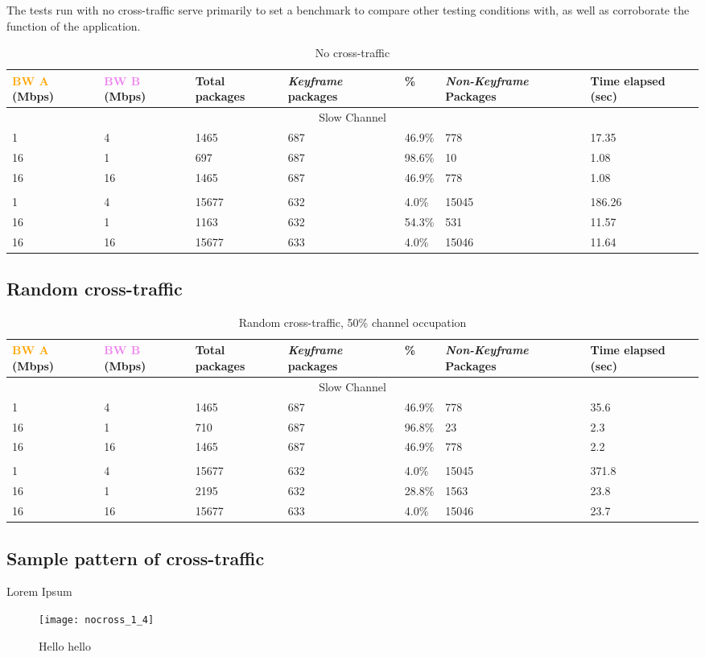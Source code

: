 The tests run with no cross-traffic serve primarily to set a benchmark to compare other testing conditions with, as well as corroborate the function of the application. 

\begin{table}[htbp]
\caption{No cross-traffic}
\break
\setlength{\arrayrulewidth}{1mm}
\setlength{\tabcolsep}{12pt}
\renewcommand{\arraystretch}{1.5}
 {
\begin{tabular}{ |p{1.375cm}|p{1.375cm}|p{1.5cm}|p{1.5cm}|p{1cm}|p{1.75cm}|p{1.75cm}| }
\hline
\textcolor{orange}{BW A} (Mbps)&\textcolor{violet}{BW B} (Mbps)& Total packages & \textit{Keyframe} packages & \% & \textit{Non-Keyframe} Packages & Time elapsed (sec) \\
\hline
\multicolumn{7}{|c|}{Slow Channel} \\
\hline
1&4&1465&687&46.9\%&778&17.35\\
16&1&697&687&98.6\%&10&1.08\\
16&16&1465&687&46.9\%&778&1.08\\
\hline
\rowcolor{white}\multicolumn{7}{|c|}{Medium Channel} \\
\hline
1&4&15677&632&4.0\%&15045&186.26\\
16&1&1163&632&54.3\%&531&11.57\\
16&16&15677&633&4.0\%&15046&11.64\\
\hline
\end{tabular}
}
\end{table}


\subsection{Random cross-traffic}

\begin{table}[htbp]
\caption{Random cross-traffic, 50\% channel occupation}
\break
\setlength{\arrayrulewidth}{1mm}
\setlength{\tabcolsep}{12pt}
\renewcommand{\arraystretch}{1.5}
 {
\begin{tabular}{ |p{1.375cm}|p{1.375cm}|p{1.5cm}|p{1.5cm}|p{1cm}|p{1.75cm}|p{1.75cm}| }
\hline
\textcolor{orange}{BW A} (Mbps)&\textcolor{violet}{BW B} (Mbps)& Total packages & \textit{Keyframe} packages & \% & \textit{Non-Keyframe} Packages & Time elapsed (sec) \\
\hline
\multicolumn{7}{|c|}{Slow Channel} \\
\hline
1&4&1465&687&46.9\%&778&35.6\\
16&1&710&687&96.8\%&23&2.3\\
16&16&1465&687&46.9\%&778&2.2\\
\hline
\rowcolor{white}\multicolumn{7}{|c|}{Medium Channel} \\
\hline
1&4&15677&632&4.0\%&15045&371.8\\
16&1&2195&632&28.8\%&1563&23.8\\
16&16&15677&633&4.0\%&15046&23.7\\
\hline
\end{tabular}
}
\end{table}

\subsection{Sample pattern of cross-traffic}

Lorem Ipsum

\begin{figure}[h]
\caption{Hello hello}
\centering
\texttt{[image: nocross\_1\_4]}
\end{figure}